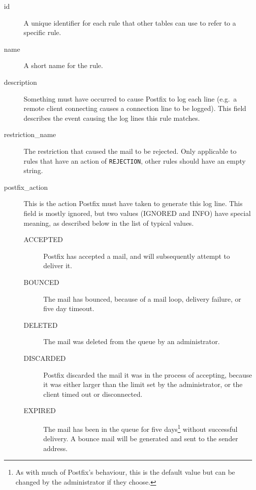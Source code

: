 \begin{description}

    \item [id] A unique identifier for each rule that other tables can use
        to refer to a specific rule.

    \item [name] A short name for the rule.

    \item [description] Something must have occurred to cause Postfix to
        log each line (e.g.\ a remote client connecting causes a connection
        line to be logged).  This field describes the event causing the log
        lines this rule matches.

    \item [restriction\_name] The restriction that caused the mail to be
        rejected.  Only applicable to rules that have an action of
        \texttt{REJECTION}, other rules should have an empty string.

    \item [postfix\_action] This is the action Postfix must have taken to
        generate this log line.  This field is mostly ignored, but two
        values (IGNORED and INFO) have special meaning, as described below
        in the list of typical values.\label{postfix_action}

        \begin{description}

            \item [ACCEPTED] Postfix has accepted a mail, and will
                subsequently attempt to deliver it.

            \item [BOUNCED] The mail has bounced, because of a mail loop,
                delivery failure, or five day timeout.

            \item [DELETED] The mail was deleted from the queue by an
                administrator.

            \item [DISCARDED] Postfix discarded the mail it was in the
                process of accepting, because it was either larger than the
                limit set by the administrator, or the client timed out or
                disconnected.

            \item [EXPIRED] The mail has been in the queue for five
                days\footnote{As with much of Postfix's behaviour, this is
                the default value but can be changed by the administrator
                if they choose.} without successful delivery.  A bounce
                mail will be generated and sent to the sender address.


\end{description}
\end{description}
